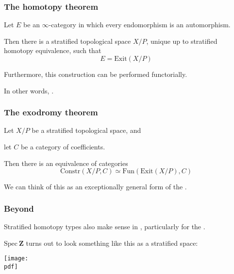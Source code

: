 \documentclass[11pt,xcolor={dvipsnames},hyperref={pdftex,pdfpagemode=UseNone,hidelinks,pdfdisplaydoctitle=true},usepdftitle=false]{beamer}
\newcommand{\Exit}{\text{Exit}}
\newcommand{\pdf}{figures.pdf}
\begin{document}
\begin{frame}
  \frametitle{The homotopy theorem}
  \begin{theorem}
    Let $E$ be an $\infty$-category in which every endomorphism is an automorphism.

    Then there is a stratified topological space $X/P$, unique up to stratified homotopy equivalence,
    such that
    \[
      E = \Exit(X/P) 
    \]

    Furthermore, this construction can be performed functorially.
  \end{theorem}
  In other words, .
\end{frame}

\begin{frame}
  \frametitle{The exodromy theorem}
  \begin{theorem}
    Let $X/P$ be a  stratified topological space, and

    let $C$ be a  category of coefficients.

    Then there is an equivalence of categories
    \[
      \text{Constr}(X/P, C) \simeq \text{Fun}(\Exit(X/P),C)
    \]
  \end{theorem}
  We can think of this as an exceptionally general form of the .
\end{frame}

\begin{frame}
  \frametitle{Beyond}
  Stratified homotopy types also make sense in , particularly for the .

  $\text{Spec}\ \mathbf{Z}$ turns out to look something like this as a stratified space:

  \texttt{[image: \\pdf]}%
\end{frame}
\end{document}
